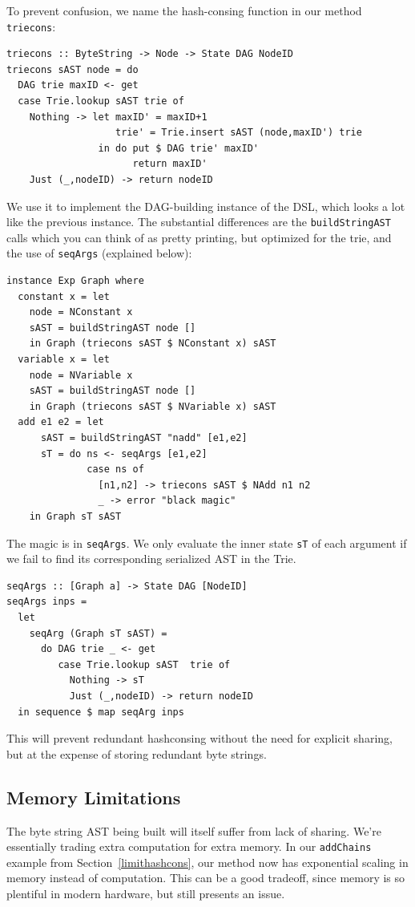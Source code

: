 \documentclass[runningheads]{llncs}
\begin{document}
To prevent confusion, we name the hash-consing function in our method \texttt{triecons}:
\begin{verbatim}
triecons :: ByteString -> Node -> State DAG NodeID
triecons sAST node = do
  DAG trie maxID <- get
  case Trie.lookup sAST trie of
    Nothing -> let maxID' = maxID+1
                   trie' = Trie.insert sAST (node,maxID') trie
                in do put $ DAG trie' maxID'
                      return maxID'
    Just (_,nodeID) -> return nodeID
\end{verbatim}
We use it to implement the DAG-building instance of the DSL,
which looks a lot like the previous instance.
The substantial differences are the 
\texttt{buildStringAST} calls
which you can think of as pretty printing, but optimized for the trie,
and the use of \texttt{seqArgs} (explained below):
\begin{verbatim}
instance Exp Graph where
  constant x = let
    node = NConstant x
    sAST = buildStringAST node []
    in Graph (triecons sAST $ NConstant x) sAST
  variable x = let
    node = NVariable x
    sAST = buildStringAST node []
    in Graph (triecons sAST $ NVariable x) sAST
  add e1 e2 = let
      sAST = buildStringAST "nadd" [e1,e2]
      sT = do ns <- seqArgs [e1,e2]
              case ns of
                [n1,n2] -> triecons sAST $ NAdd n1 n2
                _ -> error "black magic"
    in Graph sT sAST
\end{verbatim}
The magic is in \texttt{seqArgs}.
We only evaluate the inner state \texttt{sT} of each argument if we
fail to find its corresponding serialized AST in the Trie.
\begin{verbatim}
seqArgs :: [Graph a] -> State DAG [NodeID]
seqArgs inps =
  let
    seqArg (Graph sT sAST) =
      do DAG trie _ <- get
         case Trie.lookup sAST  trie of
           Nothing -> sT
           Just (_,nodeID) -> return nodeID
  in sequence $ map seqArg inps
\end{verbatim}

This will prevent
redundant hashconsing without the need for explicit sharing,
but at the expense of storing redundant byte strings. 

\subsection{Memory Limitations}
The byte string AST being built will itself suffer from lack of sharing. We're
essentially trading extra computation for extra memory. In our 
\texttt{addChains} example from Section~\ref{limithashcons}, our
method now has exponential scaling in memory instead of computation. This can be
a good tradeoff, since memory is so plentiful in modern hardware, but still
presents an issue.
\end{document}
